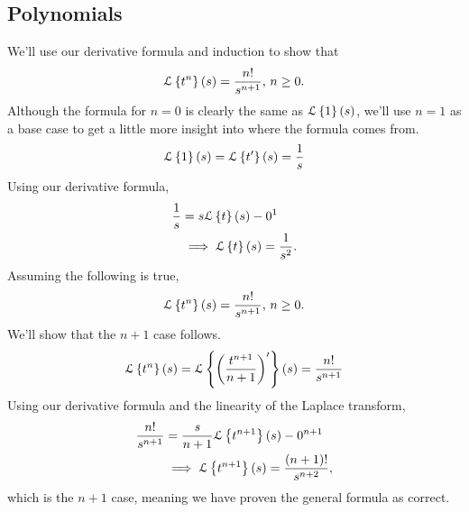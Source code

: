 \subsection{Polynomials}
\noindent
We'll use our derivative formula and induction to show that
\begin{equation*}
	\mathcal{L}\left\{ t^n \right\}\left(s\right) = \frac{n!}{s^{n+1}} \text{, } n \geq 0.
\end{equation*}
Although the formula for $n = 0$ is clearly the same as $\mathcal{L}\left\{ 1 \right\}\left(s\right)$, we'll use $n = 1$ as a base case to get a little more insight into where the formula comes from.\\
\begin{equation*}
	\mathcal{L}\left\{ 1 \right\}\left(s\right) = \mathcal{L}\left\{ t' \right\}\left(s\right) = \frac{1}{s}
\end{equation*}
Using our derivative formula,
\begin{align*}
	\frac{1}{s} &= s\mathcal{L}\left\{ t \right\}\left(s\right) - 0^{1} \\
	&\implies \mathcal{L}\left\{ t \right\}\left(s\right) = \frac{1}{s^2}.
\end{align*}
Assuming the following is true,
\begin{equation*}
	\mathcal{L}\left\{ t^n \right\}\left(s\right) = \frac{n!}{s^{n+1}} \text{, } n \geq 0.
\end{equation*}
We'll show that the $n+1$ case follows.
\begin{equation*}
	\mathcal{L}\left\{ t^n \right\}\left(s\right) = \mathcal{L}\left\{ \left(\frac{t^{n+1}}{n+1}\right)' \right\}\left(s\right) = \frac{n!}{s^{n+1}}
\end{equation*}
Using our derivative formula and the linearity of the Laplace transform,
\begin{align*}
	\frac{n!}{s^{n+1}} &= \frac{s}{n+1}\mathcal{L}\left\{ t^{n+1} \right\}\left(s\right) - 0^{n+1} \\
	&\implies \mathcal{L}\left\{ t^{n+1} \right\}\left(s\right) = \frac{(n+1)!}{s^{n+2}},
\end{align*}
which is the $n+1$ case, meaning we have proven the general formula as correct.